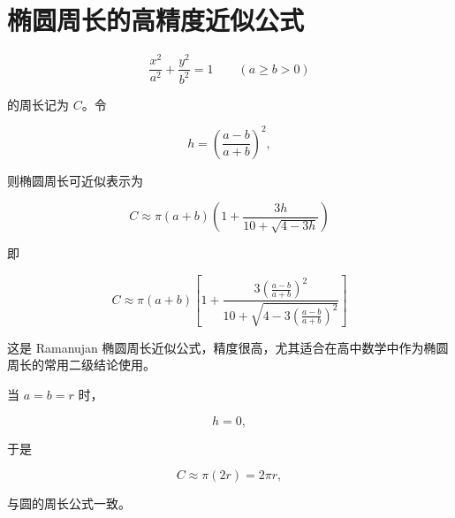 \section*{椭圆周长的高精度近似公式}

\[
\frac{x^2}{a^2}+\frac{y^2}{b^2}=1
\qquad (a\ge b>0)
\]

的周长记为 \(C\)。令

\[
h=\left(\frac{a-b}{a+b}\right)^2,
\]

则椭圆周长可近似表示为

\[
\boxed{
C\approx
\pi(a+b)
\left(
1+\frac{3h}{10+\sqrt{4-3h}}
\right)
}
\]

即

\[
\boxed{
C\approx
\pi(a+b)
\left[
1+
\frac{
3\left(\frac{a-b}{a+b}\right)^2
}{
10+\sqrt{
4-3\left(\frac{a-b}{a+b}\right)^2
}
}
\right]
}
\]

这是 Ramanujan 椭圆周长近似公式，精度很高，尤其适合在高中数学中作为椭圆周长的常用二级结论使用。

当 \(a=b=r\) 时，

\[
h=0,
\]

于是

\[
C\approx \pi(2r)=2\pi r,
\]

与圆的周长公式一致。